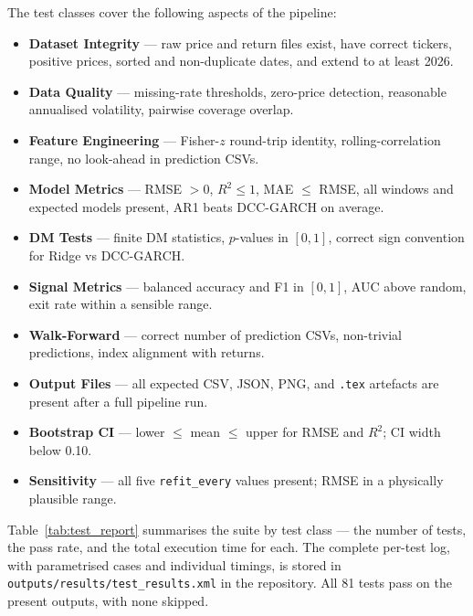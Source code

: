 The test classes cover the following aspects of the pipeline:
\begin{itemize}
    \item \textbf{Dataset Integrity} --- raw price and return files exist,
          have correct tickers, positive prices, sorted and non-duplicate dates,
          and extend to at least 2026.
    \item \textbf{Data Quality} --- missing-rate thresholds, zero-price
          detection, reasonable annualised volatility, pairwise coverage overlap.
    \item \textbf{Feature Engineering} --- Fisher-$z$ round-trip identity,
          rolling-correlation range, no look-ahead in prediction CSVs.
    \item \textbf{Model Metrics} --- RMSE $>0$, $R^2 \leq 1$, MAE $\leq$ RMSE,
          all windows and expected models present, AR1 beats DCC-GARCH on average.
    \item \textbf{DM Tests} --- finite DM statistics, $p$-values in $[0,1]$,
          correct sign convention for Ridge vs DCC-GARCH.
    \item \textbf{Signal Metrics} --- balanced accuracy and F1 in $[0,1]$,
          AUC above random, exit rate within a sensible range.
    \item \textbf{Walk-Forward} --- correct number of prediction CSVs,
          non-trivial predictions, index alignment with returns.
    \item \textbf{Output Files} --- all expected CSV, JSON, PNG, and \texttt{.tex}
          artefacts are present after a full pipeline run.
    \item \textbf{Bootstrap CI} --- lower $\leq$ mean $\leq$ upper for RMSE and
          $R^2$; CI width below 0.10.
    \item \textbf{Sensitivity} --- all five \texttt{refit\_every} values present;
          RMSE in a physically plausible range.
\end{itemize}

Table~\ref{tab:test_report} summarises the suite by test class --- the number of
tests, the pass rate, and the total execution time for each. The complete
per-test log, with parametrised cases and individual timings, is stored in
\texttt{outputs/results/test\_results.xml} in the repository. All 81 tests pass
on the present outputs, with none skipped.



\clearpage
